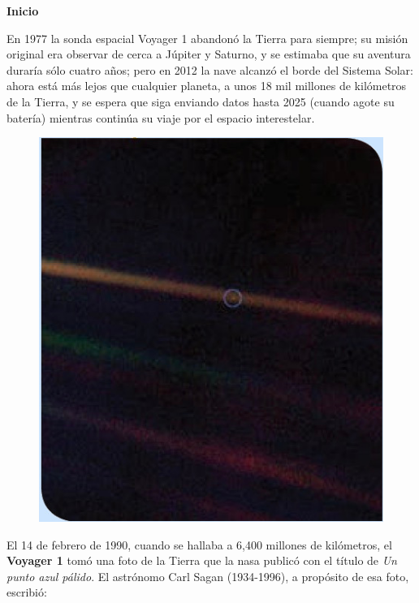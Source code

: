 \documentclass[11pt]{book}
\begin{document}
\begin{boxK}
  \begin{center}\bfseries \color{colorrds} Inicio\end{center}
  En 1977 la sonda espacial Voyager 1 abandonó la Tierra para siempre; su misión original
  era observar de cerca a Júpiter y Saturno, y se estimaba que su aventura duraría sólo
  cuatro años; pero en 2012 la nave alcanzó el borde del Sistema Solar: ahora está más
  lejos que cualquier planeta, a unos 18 mil millones de kilómetros de la Tierra,
  y se espera que siga enviando datos hasta 2025 (cuando agote su batería) mientras
  continúa su viaje por el espacio interestelar.\\

  \begin{figure}
    \centering
    \includegraphics[width=\linewidth]{tierra.jpg}
    \label{fig:tierra}
  \end{figure}

  El 14 de febrero de 1990, cuando se hallaba a 6,400 millones de kilómetros,
  el \textbf{Voyager 1} tomó una foto de la Tierra que la nasa publicó con el
  t\'itulo de \emph{Un punto azul pálido}. El astrónomo Carl Sagan (1934-1996), a propósito de esa foto, escribió:


\end{boxK}
\end{document}
